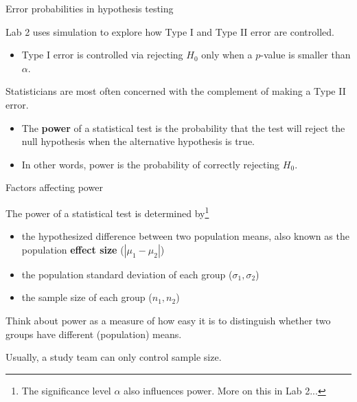 \documentclass[
  ignorenonframetext,
  aspectratio=169]{beamer}
\providecommand{\tightlist}{%
  \setlength{\itemsep}{0pt}\setlength{\parskip}{0pt}}
\begin{document}
\begin{frame}{Error probabilities in hypothesis testing}
\protect\hypertarget{error-probabilities-in-hypothesis-testing}{}
\small

Lab 2 uses simulation to explore how Type I and Type II error are
controlled.

\begin{itemize}
\tightlist
\item
  Type I error is controlled via rejecting \(H_0\) only when a
  \(p\)-value is smaller than \(\alpha\).
\end{itemize}

Statisticians are most often concerned with the complement of making a
Type II error.

\begin{itemize}
\item
  The \textbf{power} of a statistical test is the probability that the
  test will reject the null hypothesis when the alternative hypothesis
  is true.
\item
  In other words, power is the probability of correctly rejecting
  \(H_0\).
\end{itemize}
\end{frame}

\begin{frame}{Factors affecting power}
\protect\hypertarget{factors-affecting-power}{}
\small

The power of a statistical test is determined
by\footnote{The significance level $\alpha$ also influences power. More on this in Lab 2...}

\begin{itemize}
\item
  the hypothesized difference between two population means, also known
  as the population \textbf{effect size} (\(|\mu_1 - \mu_2|\))
\item
  the population standard deviation of each group
  (\(\sigma_1, \sigma_2\))
\item
  the sample size of each group (\(n_1, n_2\))
\end{itemize}

Think about power as a measure of how easy it is to distinguish whether
two groups have different (population) means.

Usually, a study team can only control sample size.
\end{frame}
\end{document}
